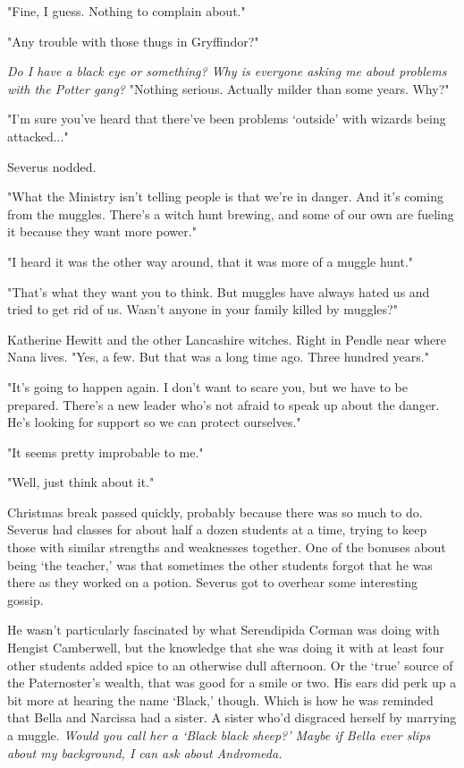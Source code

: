 \documentclass[a4paper,11pt]{article}
\begin{document}
"Fine, I guess. Nothing to complain about."

"Any trouble with those thugs in Gryffindor?"

\emph{Do I have a black eye or something? Why is everyone asking me about problems with the Potter gang?} "Nothing serious. Actually milder than some years. Why?"

"I'm sure you've heard that there've been problems `outside' with wizards being attacked..."

Severus nodded.

"What the Ministry isn't telling people is that we're in danger. And it's coming from the muggles. There's a witch hunt brewing, and some of our own are fueling it because they want more power."

"I heard it was the other way around, that it was more of a muggle hunt."

"That's what they want you to think. But muggles have always hated us and tried to get rid of us. Wasn't anyone in your family killed by muggles?"

Katherine Hewitt and the other Lancashire witches. Right in Pendle near where Nana lives. "Yes, a few. But that was a long time ago. Three hundred years."

"It's going to happen again. I don't want to scare you, but we have to be prepared. There's a new leader who's not afraid to speak up about the danger. He's looking for support so we can protect ourselves."

"It seems pretty improbable to me."

"Well, just think about it."

Christmas break passed quickly, probably because there was so much to do. Severus had classes for about half a dozen students at a time, trying to keep those with similar strengths and weaknesses together. One of the bonuses about being `the teacher,' was that sometimes the other students forgot that he was there as they worked on a potion. Severus got to overhear some interesting gossip.

He wasn't particularly fascinated by what Serendipida Corman was doing with Hengist Camberwell, but the knowledge that she was doing it with at least four other students added spice to an otherwise dull afternoon. Or the `true' source of the Paternoster's wealth, that was good for a smile or two. His ears did perk up a bit more at hearing the name `Black,' though. Which is how he was reminded that Bella and Narcissa had a sister. A sister who'd disgraced herself by marrying a muggle. \emph{Would you call her a `Black black sheep?' Maybe if Bella ever slips about my background, I can ask about Andromeda.}
\end{document}
